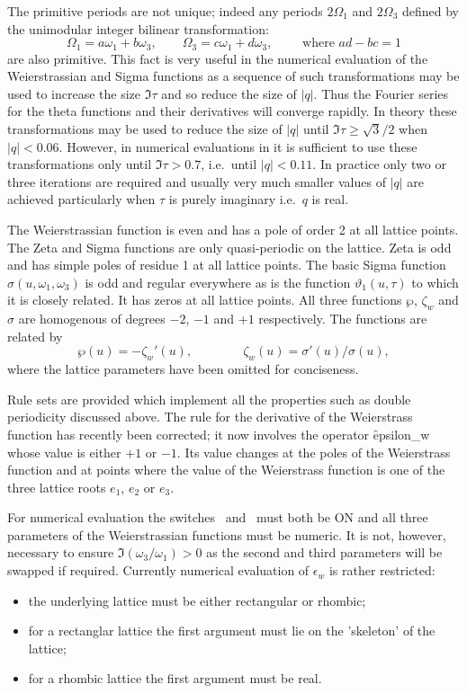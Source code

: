 The primitive periods are not unique;
indeed any periods $2\Omega_1$ and $2\Omega_3$ defined by the unimodular integer bilinear transformation:
\[\Omega_1 = a\omega_1 + b\omega_3,\qquad\Omega_3 = c\omega_1 + d\omega_3,\qquad\text{ where }ad-bc = 1\]
are also primitive. This fact is very useful in the numerical evaluation of the Weierstrassian and Sigma
functions as a sequence of such transformations may be used to increase the size $\Im \tau$ and so reduce
the size of $|q|$. Thus the Fourier series for the theta functions and their derivatives will converge rapidly.
In theory these transformations may be used to reduce the size of $|q|$ until $\Im \tau \geq \sqrt 3/2$ when
$|q|<0.06$. However, in numerical evaluations in \REDUCE it is sufficient to use these transformations only until
$\Im \tau > 0.7$, i.e.~until $|q| < 0.11$. In practice only two or three iterations are required
and usually very much smaller values of $|q|$ are achieved particularly when $\tau$ is purely imaginary i.e.~$q$ is real.

The Weierstrassian function is even and has a pole of order 2 at all lattice points.
The Zeta and Sigma functions are only quasi-periodic on the lattice. Zeta is odd and has simple poles of residue
1 at all lattice points. The basic Sigma function $\sigma(u,\omega_1,\omega_3)$ is odd and regular everywhere as is
the function $\vartheta_1(u,\tau)$ to which it is closely related. It has zeros at all lattice points. All three functions
$\wp$, $\zeta_w$ and $\sigma$ are homogenous of degrees $-2$, $-1$ and $+1$ respectively. The functions are related by
\[ \wp(u) = -\zeta_w'(u),\qquad\qquad \zeta_w(u) = \sigma'(u)/\sigma(u),\]
where the lattice parameters have been omitted for conciseness.

Rule sets are provided which implement all the properties such as double periodicity
discussed above. The rule for the derivative of the Weierstrass function has recently
been corrected; it now involves the operator \f{epsilon\_w} whose value is either $+1$ or $-1$.
Its value changes at the poles of the Weierstrass function and at points where the value
of the Weierstrass function is one of the three lattice roots $e_1$, $e_2$ or $e_3$.

For numerical evaluation the switches \ and \ must both
be ON and all three parameters of the Weierstrassian functions must be numeric.
It is not, however, necessary to ensure $\Im(\omega_3/\omega_1) >0$ as
the second and third parameters will be swapped if required.
Currently numerical evaluation of $\epsilon_{w}$ is rather restricted:
\begin{itemize}
\item  the underlying lattice must be either rectangular or rhombic;
\item  for a rectanglar lattice the first argument must lie on the 'skeleton'
  of the lattice;
\item for a rhombic lattice the first argument must be real.
\end{itemize}

